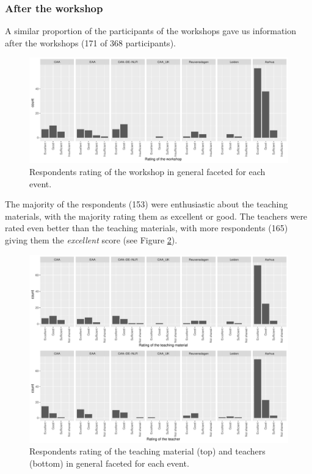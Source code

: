 \documentclass[
]{article}
\begin{document}
\hypertarget{after-the-workshop}{%
\subsubsection{After the workshop}\label{after-the-workshop}}

A similar proportion of the participants of the workshops gave us information after the workshops (171 of 368 participants).

\begin{figure}
\centering
\includegraphics{paper_files/figure-latex/rating-workshop-1.pdf}
\caption{\label{fig:rating-workshop}Respondents rating of the workshop in general faceted for each event.}
\end{figure}

The majority of the respondents (153) were enthusiastic about the teaching materials, with the majority rating them as excellent or good. The teachers were rated even better than the teaching materials, with more respondents (165) giving them the \emph{excellent} score (see Figure \ref{fig:rating-teaching}).

\begin{figure}
\centering
\includegraphics{paper_files/figure-latex/rating-teaching-1.pdf}
\caption{\label{fig:rating-teaching}Respondents rating of the teaching material (top) and teachers (bottom) in general faceted for each event.}
\end{figure}
\end{document}
